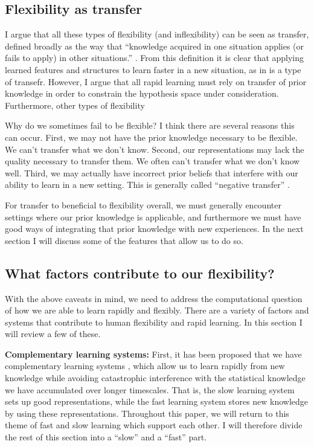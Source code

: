 \documentclass[11pt]{article}
\begin{document}
\subsection{Flexibility as transfer}
I argue that all these types of flexibility (and inflexibility) can be seen as transfer, defined broadly as the way that ``knowledge acquired in one situation applies (or fails to apply) in other situations.'' \citep{Singley1989}. From this definition it is clear that applying learned features and structures to learn faster in a new situation, as in \citet{Bourne1970} is a type of transefr. However, I argue that all rapid learning must rely on transfer of prior knowledge in order to constrain the hypothesis space under consideration. Furthermore, other types of flexibility  \par  
Why do we sometimes fail to be flexible? I think there are several reasons this can occur. First, we may not have the prior knowledge necessary to be flexible. We can't transfer what we don't know. Second, our representations may lack the quality necessary to transfer them. We often can't transfer what we don't know well. Third, we may actually have incorrect prior beliefs that interfere with our ability to learn in a new setting. This is generally called ``negative transfer'' \citep{Singley1989}. \par
For transfer to beneficial to flexibility overall, we must generally encounter settings where our prior knowledge is applicable, and furthermore we must have good ways of integrating that prior knowledge with new experiences. In the next section I will discuss some of the features that allow us to do so. \par

\subsection{What factors contribute to our flexibility?}
With the above caveats in mind, we need to address the computational question of how we are able to learn rapidly and flexibly. There are a variety of factors and systems that contribute to human flexibility and rapid learning. In this section I will review a few of these. \par 

\textbf{Complementary learning systems:} First, it has been proposed that we have complementary learning systems \citep{McClelland1995, Kumaran2016}, which allow us to learn rapidly from new knowledge while avoiding catastrophic interference \citep{McCloskey1989} with the statistical knowledge we have accumulated over longer timescales. That is, the slow learning system sets up good representations, while the fast learning system stores new knowledge by using these representations. Throughout this paper, we will return to this theme of fast and slow learning which support each other. I will therefore divide the rest of this section into a ``slow'' and a ``fast'' part. \par
\end{document}
